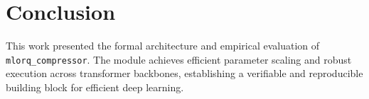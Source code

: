 \section{Conclusion}
This work presented the formal architecture and empirical evaluation of \texttt{mlorq_compressor}. The module achieves efficient parameter scaling and robust execution across transformer backbones, establishing a verifiable and reproducible building block for efficient deep learning.
